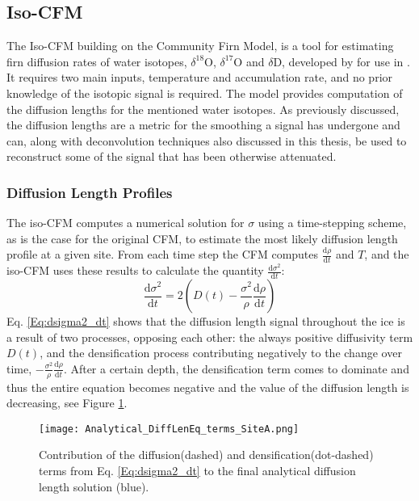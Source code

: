 \documentclass[../../CompleteThesis2/Complete_2ndDraft]{subfiles}
\begin{document}
\subsection[Iso-CFM]{Iso-CFM}
\label{Subsec:Ice_DiffusionAndDensification_IsoCFM}

The Iso-CFM building on the Community Firn Model, is a tool for estimating firn diffusion rates of water isotopes, $\delta^{18}$O, $\delta^{17}$O and $\delta$D, developed by \cite[Gkinis et al., 2021]{Gkinis_2021} for use in \cite{Gkinis_2021}. It requires two main inputs, temperature and accumulation rate, and no prior knowledge of the isotopic signal is required. The model provides computation of the diffusion lengths for the mentioned water isotopes. As previously discussed, the diffusion lengths are a metric for the smoothing a signal has undergone and can, along with deconvolution techniques also discussed in this thesis, be used to reconstruct some of the signal that has been otherwise attenuated.


\subsubsection[Diffusion Length Profiles]{Diffusion Length Profiles}
\label{Subsubsec:Ice_DiffusionAndDensification_IsoCFM_DiffLenProfile}

The iso-CFM computes a numerical solution for $\sigma$ using a time-stepping scheme, as is the case for the original CFM, to estimate the most likely diffusion length profile at a given site. From each time step the CFM computes $\frac{\text{d}\rho}{\text{d}t}$ and $T$, and the iso-CFM uses these results to calculate the quantity $\frac{\text{d}\sigma^2}{\text{d}t}$:
\begin{equation}
	\frac{\text{d}\sigma^2}{\text{d}t} = 2\left(D(t) - \frac{\sigma^2}{\rho}\frac{\text{d}\rho}{\text{d}t}\right)
	\label{Eq:dsigma2_dt}
\end{equation}
Eq. \ref{Eq:dsigma2_dt} shows that the diffusion length signal throughout the ice is a result of two processes, opposing each other: the always positive diffusivity term $D(t)$, and the densification process contributing negatively to the change over time, $-\frac{\sigma^2}{\rho}\frac{\text{d}\rho}{\text{d}t}$. After a certain depth, the densification term comes to dominate and thus the entire equation becomes negative and the value of the diffusion length is decreasing, see Figure \ref{Fig:ICE_DiffDensTerms}.

\begin{figure}
	\centering
	\texttt{[image: Analytical\_DiffLenEq\_terms\_SiteA.png]}
	\caption{Contribution of the diffusion(dashed) and densification(dot-dashed) terms from Eq. \ref{Eq:dsigma2_dt} to the final analytical diffusion length solution (blue).}
	\label{Fig:ICE_DiffDensTerms}
\end{figure}
\end{document}
